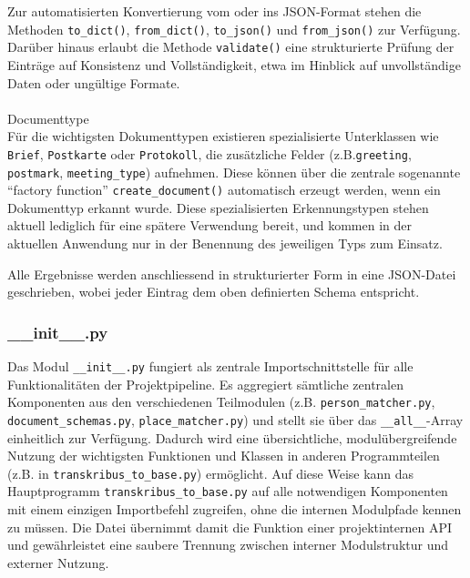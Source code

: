 \documentclass[12pt, a4paper, ngerman, bidi=default]{article}
\makeatletter
\newcommand{\code}[1]{\colorbox{VeryLightGray}{\texttt{#1}}} %
\let\oldparagraph\paragraph%
\renewcommand{\paragraph}{
    \@ifstar%
      \xxxParagraphStar%
      \xxxParagraphNoStar%
 }
\newcommand{\xxxParagraphStar}[1]{\oldparagraph*{#1}\mbox{}}
\newcommand{\xxxParagraphNoStar}[1]{\oldparagraph{#1}\mbox{}}
\makeatother
\begin{document}
Zur automatisierten Konvertierung vom oder ins JSON-Format stehen die Methoden \code{to\_dict()}, \code{from\_dict()}, \code{to\_json()} und \code{from\_json()} zur Verfügung. Darüber hinaus erlaubt die Methode \code{validate()} eine strukturierte Prüfung der Einträge auf Konsistenz und Vollständigkeit, etwa im Hinblick auf unvollständige Daten oder ungültige Formate.

\paragraph{Documenttype}\\
Für die wichtigsten Dokumenttypen existieren spezialisierte Unterklassen wie \code{Brief}, 
\code{Postkarte} oder \code{Protokoll}, die zusätzliche Felder (z.B.\code{greeting}, \code{postmark}, \code{meeting\_type}) aufnehmen. 
Diese können über die zentrale sogenannte \enquote{factory function} \code{create\_document()} automatisch erzeugt werden, wenn ein Dokumenttyp erkannt wurde. 
Diese spezialisierten Erkennungstypen stehen aktuell lediglich für eine spätere Verwendung bereit, und kommen in der aktuellen Anwendung nur in der Benennung des jeweiligen Typs zum Einsatz.

Alle Ergebnisse werden anschliessend in strukturierter Form in eine JSON-Datei geschrieben, wobei jeder Eintrag dem oben definierten Schema 
entspricht. 
\subsubsection{\_\_init\_\_.py}\label{subsec:init_module}
Das Modul \code{\_\_init\_\_.py} fungiert als zentrale Importschnittstelle für alle Funktionalitäten der Projektpipeline. Es aggregiert sämtliche zentralen Komponenten aus den verschiedenen Teilmodulen (z.B. \code{person\_matcher.py}, \code{document\_schemas.py}, \code{place\_matcher.py}) und stellt sie über das \code{\_\_all\_\_}-Array einheitlich zur Verfügung. Dadurch wird eine übersichtliche, modulübergreifende Nutzung der wichtigsten Funktionen und Klassen in anderen Programmteilen (z.B. in \code{transkribus\_to\_base.py}) ermöglicht.
Auf diese Weise kann das Hauptprogramm \code{transkribus\_to\_base.py} auf alle notwendigen Komponenten mit einem einzigen Importbefehl zugreifen, ohne die internen Modulpfade kennen zu müssen. Die Datei übernimmt damit die Funktion einer projektinternen API und gewährleistet eine saubere Trennung zwischen interner Modulstruktur und externer Nutzung. 
\end{document}

